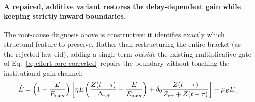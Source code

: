 \documentclass[twocolumn,10pt]{article}
\begin{document}
\paragraph{A repaired, additive variant restores the delay-dependent gain while keeping strictly inward boundaries.} The root-cause diagnosis above is constructive: it identifies exactly which structural feature to preserve. Rather than restructuring the entire bracket (as the rejected law did), adding a single term \emph{outside} the existing multiplicative gate of Eq.~\eqref{eq:effort-core-corrected} repairs the boundary without touching the institutional gain channel:
\begin{equation}
\dot{E} = \Bigl(1-\frac{E}{E_{\max}}\Bigr)\left[\eta E \left( \frac{Z(t-\tau)}{\Delta_{\text{ref}}} - \frac{E}{E_{\max}} \right) + \delta_0 \frac{Z(t-\tau)}{Z_{\text{ref}} + Z(t-\tau)}\right] - \mu_EE,
\label{eq:effort-core-hybrid}
\end{equation}
\end{document}

